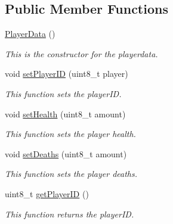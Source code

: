 \subsection*{Public Member Functions}
\begin{DoxyCompactItemize}
\item 
\mbox{\hyperlink{class_player_data_aaf3e4cbb80f8eb74f946fd858df68f19}{Player\+Data}} ()
\begin{DoxyCompactList}\small\item\em This is the constructor for the playerdata. \end{DoxyCompactList}\item 
\mbox{\label{class_player_data_a9911cd97b9b1566c5add59ceb9bda3c5}} 
void \mbox{\hyperlink{class_player_data_a9911cd97b9b1566c5add59ceb9bda3c5}{set\+Player\+ID}} (uint8\+\_\+t player)
\begin{DoxyCompactList}\small\item\em This function sets the player\+ID. \end{DoxyCompactList}\item 
\mbox{\label{class_player_data_a36f677fbe367f13a058a6f57509c7d3c}} 
void \mbox{\hyperlink{class_player_data_a36f677fbe367f13a058a6f57509c7d3c}{set\+Health}} (uint8\+\_\+t amount)
\begin{DoxyCompactList}\small\item\em This function sets the player health. \end{DoxyCompactList}\item 
\mbox{\label{class_player_data_a5f19ad6aadf0a3432750f4277313bd9d}} 
void \mbox{\hyperlink{class_player_data_a5f19ad6aadf0a3432750f4277313bd9d}{set\+Deaths}} (uint8\+\_\+t amount)
\begin{DoxyCompactList}\small\item\em This function sets the player deaths. \end{DoxyCompactList}\item 
\mbox{\label{class_player_data_a941480a74b65933f0d82c891adcf0951}} 
uint8\+\_\+t \mbox{\hyperlink{class_player_data_a941480a74b65933f0d82c891adcf0951}{get\+Player\+ID}} ()
\begin{DoxyCompactList}\small\item\em This function returns the player\+ID. \end{DoxyCompactList}\item 

\end{DoxyCompactItemize}
